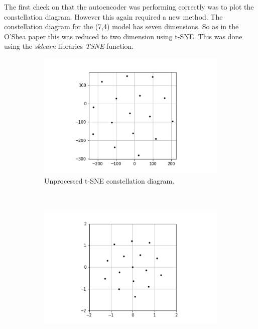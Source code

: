\documentclass[12pt,onecolumn,letterpaper]{article}
\newcommand{\code}{\textit}
\begin{document}
The first check on that the autoencoder was performing correctly was to plot the constellation diagram. However this again required a new method. The constellation diagram for the (7,4) model has seven dimensions. So as in the O'Shea paper this was reduced to two dimension using t-SNE. This was done using the \code{sklearn} libraries \code{TSNE} function. 

\begin{figure}[t!]
   \centering
   \begin{subfigure}[t]{0.3\textwidth}
      \centering
      \includegraphics[width=\linewidth]{figures/tSNE_7_4_constellation_diagram_unnormalised.png}
      \caption{Unprocessed t-SNE constellation diagram.}
  \end{subfigure}
  ~
  \begin{subfigure}[t]{0.3\textwidth}
       \centering
       \includegraphics[width=\linewidth]{figures/leaky_relu_7_4_constellation_diagram.png}

\end{subfigure}
\end{figure}
\end{document}

